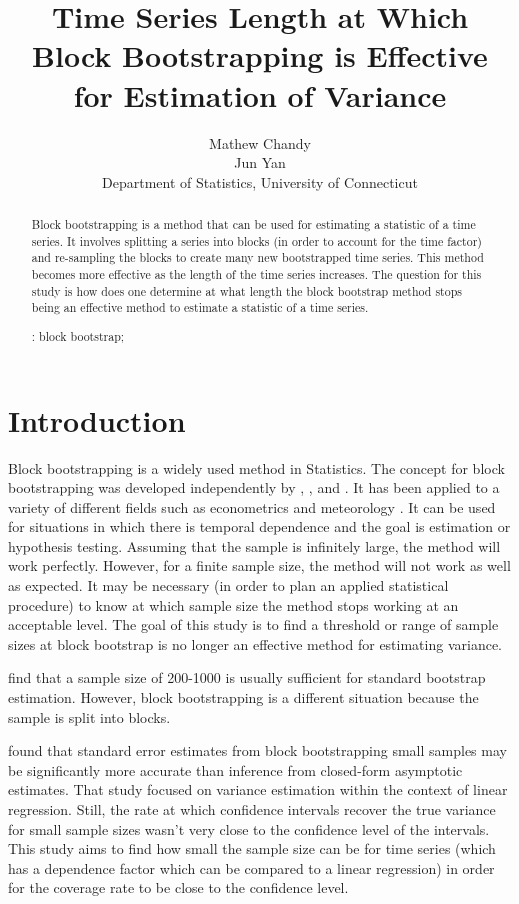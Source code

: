 \documentclass[12pt, letterpaper, titlepage]{article}
\title{Time Series Length at Which Block Bootstrapping is Effective for Estimation of Variance}
\author{Mathew Chandy\\
  Jun Yan\\[1ex]
  Department of Statistics, University of Connecticut\\
}
\date{}
\begin{document}
 
\maketitle

\doublespace

\begin{abstract}
Block bootstrapping is a method that can be used for estimating a statistic of a time
series. It involves splitting a series into blocks (in order to account for the time
factor) and re-sampling the blocks to create many new bootstrapped time series.
This method becomes more effective as the length of the time series increases. 
The question for this study is how does one determine at what length the block
bootstrap method stops being an effective method to estimate a statistic of a time
series.

\bigskip
\noindent{}:
block bootstrap;
\end{abstract}

\section{Introduction}
\label{sec:intro}

Block bootstrapping is a widely used method in Statistics. The concept for block 
bootstrapping was developed independently by \citet{hall1985resampling}, \citet{carlstein1986use}, and 
\citet{kunsch1989jackknife}. \citet{radovanov2014comparison} It has been applied to a variety of 
different fields such 
as econometrics \citep{mackinnon2006bootstrap} and meteorology \citep{varga2017generalised}. It can be used for 
situations in which there is temporal dependence and the goal is estimation or hypothesis 
testing. Assuming that the sample is infinitely 
large, the method will work perfectly. However, for a finite sample size, the method will 
not work as well as expected. It may be necessary (in order to plan an applied 
statistical 
procedure) to know at which sample size the method stops working at an acceptable level. 
The goal of this study is to find a threshold or range of sample sizes at block bootstrap 
is no longer an effective method for estimating variance.


\citet{nevitt2001performance} find that a sample size of 200-1000 is usually sufficient for standard 
bootstrap estimation. However, block bootstrapping is a different situation because the 
sample is split into blocks.

\citet{goncalves2005bootstrap} found that standard error estimates from block bootstrapping small 
samples 
may be significantly more accurate than inference from closed-form asymptotic estimates. That study focused on variance estimation within the context of linear regression. Still, the rate at which confidence intervals recover the true variance for small sample sizes wasn't very close to the confidence level of the intervals. This study aims to find how small the sample size can be for time series (which has a dependence factor which can be compared to a linear regression) in order for the coverage rate to be close to the confidence level.
\end{document}
